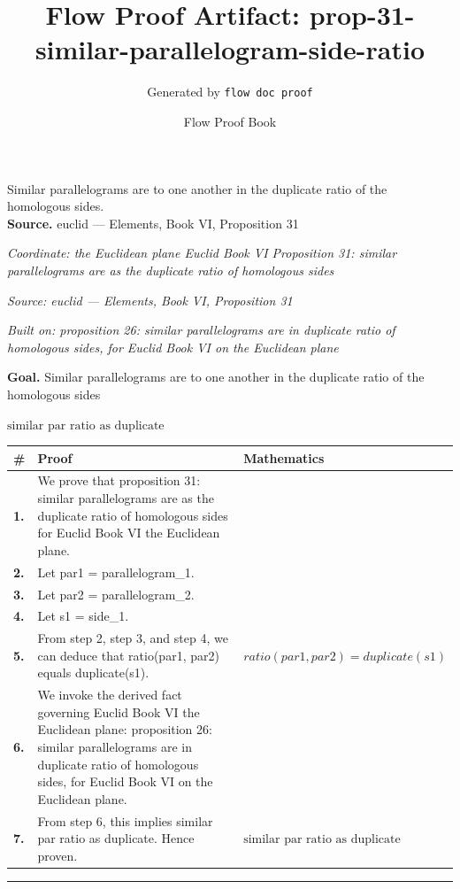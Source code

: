 \documentclass[11pt]{article}
\title{Flow Proof Artifact: prop-31-similar-parallelogram-side-ratio}
\author{Generated by \texttt{flow doc proof}}
\date{Flow Proof Book}
\theoremstyle{definition}
\begin{document}
\maketitle
Similar parallelograms are to one another in the duplicate ratio of the homologous sides.\\[0.5em]
\textbf{Source.} euclid — Elements, Book VI, Proposition 31\\[0.5em]
\bigskip
{}\par
\smallskip\noindent\textit{Coordinate: the Euclidean plane \cdot Euclid Book VI \cdot Proposition 31: similar parallelograms are as the duplicate ratio of homologous sides}\par
\smallskip\noindent\textit{Source: euclid — Elements, Book VI, Proposition 31}\par
\smallskip\noindent\textit{Built on: proposition 26: similar parallelograms are in duplicate ratio of homologous sides, for Euclid Book VI on the Euclidean plane}\par
\medskip
\noindent\textbf{Goal.} Similar parallelograms are to one another in the duplicate ratio of the homologous sides\par
\noindent$\displaystyle \text{similar par ratio as duplicate}$\par
\medskip
\noindent
\begin{tabular}{@{} >{\raggedright\arraybackslash}p{} >{\raggedright\arraybackslash}p{} >{\raggedleft\arraybackslash}p{} @{}}
\textbf{\#} & \textbf{Proof} & \textbf{Mathematics} \\
\midrule
\textbf{1.} & We prove that proposition 31: similar parallelograms are as the duplicate ratio of homologous sides for Euclid Book VI the Euclidean plane. & \\[0.45em]
\textbf{2.} & Let par1 = parallelogram\_1. & \\[0.45em]
\textbf{3.} & Let par2 = parallelogram\_2. & \\[0.45em]
\textbf{4.} & Let s1 = side\_1. & \\[0.45em]
\textbf{5.} & From step 2, step 3, and step 4, we can deduce that ratio(par1, par2) equals duplicate(s1). & $\displaystyle ratio(par1, par2) = duplicate(s1)$ \\[0.45em]
\textbf{6.} & We invoke the derived fact governing Euclid Book VI the Euclidean plane: proposition 26: similar parallelograms are in duplicate ratio of homologous sides, for Euclid Book VI on the Euclidean plane. & \\[0.45em]
\textbf{7.} & From step 6, this implies similar par ratio as duplicate. Hence proven. & $\displaystyle \text{similar par ratio as duplicate}$ \\[0.45em]
\bottomrule
\end{tabular}
\label{thm:Geometry-Euclid Book VI-proposition_31_similar_parallelograms_are_as_the_duplicate_ratio_of_homologous_sides}
\par\medskip\hrule
\end{document}
